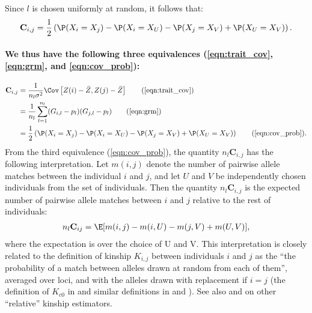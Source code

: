 %
Since $l$ is chosen uniformly at random, it follows that:
%
\small{
\begin{align} \label{eqn:cov_prob} %
    \mathbf{C}_{i,j} = \frac{1}{2}\left(\P(X_i = X_j) - \P(X_i = X_U) - \P(X_j = X_V) + \P(X_U = X_V) \right).
\end{align}
}

\paragraph{We thus have the following three equivalences
(\ref{eqn:trait_cov}, \ref{eqn:grm}, and \ref{eqn:cov_prob}):}
%
\begin{align} \label{eqn:equivalence} %
    \mathbf{C}_{i,j} &= \frac{1}{n_l \sigma^2}\Cov\left[Z(i) - \bar{Z}, Z(j) - \bar{Z}\right] \tag{\ref{eqn:trait_cov}} \\
                     &= \frac{1}{n_l}\sum_{l=1}^{n_l} (G_{i,l} - p_l)(G_{j,l} - p_l) \tag{\ref{eqn:grm}} \\
                     &= \frac{1}{2}\left(\P(X_i = X_j) - \P(X_i = X_U) - \P(X_j = X_V) + \P(X_U = X_V) \right) \tag{\ref{eqn:cov_prob}}.
\end{align}
%
From the third equivalence (\ref{eqn:cov_prob}),
the quantity $n_l\mathbf{C}_{i,j}$ has the following interpretation.
%
Let $m(i,j)$ denote the number of pairwise allele matches between
the individual $i$ and $j$,
and let $U$ and $V$ be independently chosen individuals from the set of individuals.
%
Then the quantity $n_l\mathbf{C}_{i,j}$
is the expected number of pairwise allele matches between $i$ and $j$
relative to the rest of individuals:
%
\begin{align} \label{eqn:relative_allele_matches} %
    n_l\mathbf{C}_{ij} = \E[m(i,j) - m(i,U) - m(j,V) + m(U,V)],
\end{align}
%
where the expectation is over the choice of U and V.
%
This interpretation is closely related to the definition of kinship $K_{i,j}$
between individuals $i$ and $j$ as the
``the probability of a match between alleles drawn at random from each of them'',
averaged over loci, and with the alleles drawn with replacement if $i=j$
(the definition of $K_{c0}$ in \cite{speed2015relatedness}
and similar definitions in \cite{vanraden2008efficient} and \cite{yang2010common}).
%
See also \cite{weir2017unified, weir2018how} and \cite{ochoa2021estimating} on
other ``relative'' kinship estimators.

